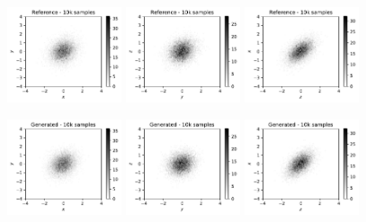 \documentclass[twocolumn,preprintnumbers,superscriptaddress]{revtex4-2}
\begin{document}
\begin{figure}
  \includegraphics[width=0.3\textwidth]{plots/3Dgaussian_posdef/1-2_REAL_10k.pdf}%
  \includegraphics[width=0.3\textwidth]{plots/3Dgaussian_posdef/2-3_REAL_10k.pdf}%
  \includegraphics[width=0.3\textwidth]{plots/3Dgaussian_posdef/3-1_REAL_10k.pdf}

  \includegraphics[width=0.3\textwidth]{plots/3Dgaussian_posdef/1-2_FAKE_10k.pdf}%
  \includegraphics[width=0.3\textwidth]{plots/3Dgaussian_posdef/2-3_FAKE_10k.pdf}%
  \includegraphics[width=0.3\textwidth]{plots/3Dgaussian_posdef/3-1_FAKE_10k.pdf}


\end{figure}
\end{document}
